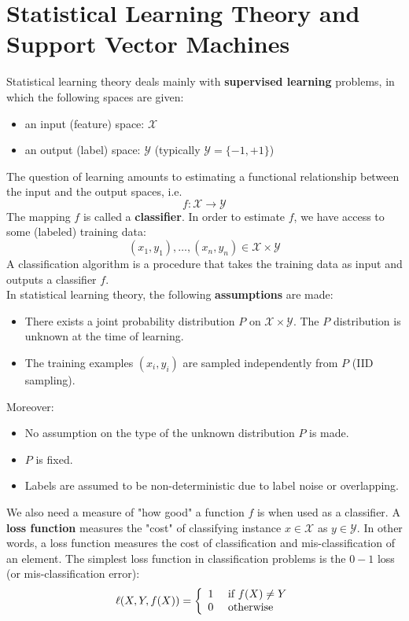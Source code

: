 \section{Statistical Learning Theory and Support Vector Machines}
Statistical learning theory deals mainly with \textbf{supervised learning} problems, in which the following spaces are given:
\begin{itemize}
	\item an input (feature) space: $\mathcal{X}$
	\item an output (label) space: $\mathcal{Y}$ (typically $\mathcal{Y} = \{-1,+1\}$)
\end{itemize}
The question of learning amounts to estimating a functional relationship between the input and the output spaces, i.e.
$$f: \mathcal{X} \rightarrow \mathcal{Y}$$
The mapping $f$ is called a \textbf{classifier}. In order to estimate $f$, we have access to some (labeled) training data:
$$(x_1,y_1), \dots, (x_n, y_n) \in \mathcal{X} \times \mathcal{Y}$$
A classification algorithm is a procedure that takes the training data as input and outputs a classifier $f$.\\
In statistical learning theory, the following \textbf{assumptions} are made:
\begin{itemize}
	\item There exists a joint probability distribution $P$ on $\mathcal{X} \times \mathcal{Y}$. The $P$ distribution is unknown at the time of learning. 
	\item The training examples $(x_i, y_i)$ are sampled independently from $P$ (IID sampling).
\end{itemize}
Moreover:
\begin{itemize}
	\item No assumption on the type of the unknown distribution $P$ is made.
	\item $P$ is fixed.
	\item Labels are assumed to be non-deterministic due to label noise or overlapping.
\end{itemize}
We also need a measure of "how good" a function $f$ is when used as a classifier. A \textbf{loss function} measures the "cost" of classifying instance $x \in \mathcal{X}$ as $y \in \mathcal{Y}$. In other words, a loss function measures the cost of classification and mis-classification of an element. The simplest loss function in classification problems is the $0-1$ loss (or mis-classification error):
$$
\ell ( X , Y , f ( X ) ) = 
\left\{ \begin{array} { l l } { 1 } & { \text { if } f ( X ) \neq Y } \\ 
{ 0 } & { \text { otherwise } } \end{array} \right.
$$

